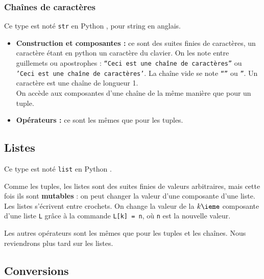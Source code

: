 \subsubsection{Chaînes de caractères}
\begin{defi}
Ce type est noté \texttt{str} en Python , pour {string} en anglais.
\begin{itemize}
\item \textbf{Construction et composantes :} ce sont des suites finies de caractères, un caractère étant en python un caractère du clavier. On 
les note entre guillemets ou apostrophes : \texttt{``Ceci est une chaîne de caractères''} ou  
\texttt{'Ceci est une chaîne de caractères'}. La chaîne vide se note \texttt{``}\texttt{''} ou 
\texttt{''}. Un caractère est une chaîne de longueur 1.\\
On accède aux composantes d'une chaîne de la même manière que pour un tuple.
\item \textbf{Opérateurs :} ce sont les mêmes que pour les tuples.
\end{itemize}
\end{defi}

\subsection{Listes}

\begin{defi}[Listes]
Ce type est noté \texttt{list} en Python .

Comme les tuples, les {listes} sont des suites finies de valeurs arbitraires, mais cette fois 
ils sont \textbf{mutables} : on peut changer la valeur d'une composante d'une liste.\\
Les listes s'écrivent entre crochets. On change la valeur de la $k\ieme$ composante d'une liste 
\texttt{L} grâce à la commande \texttt{L[k] = n}, où \texttt{n} est la nouvelle valeur.

Les autres opérateurs sont les mêmes que pour les tuples et les chaînes. Nous reviendrons plus tard sur les listes.
\end{defi}

\subsection{Conversions}

